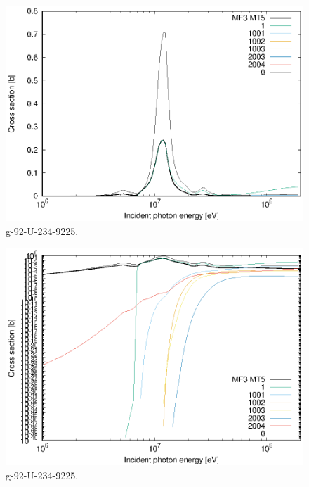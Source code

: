 \begin{figure}
 \includegraphics[width=\linewidth]{eps/g_92-U-234_9225.eps}
  \caption{g-92-U-234-9225.}
\end{figure}
\begin{figure}
 \includegraphics[width=\linewidth]{eps-log/g_92-U-234_9225.eps}
 \caption{g-92-U-234-9225.}
\end{figure}
\newpage \clearpage


